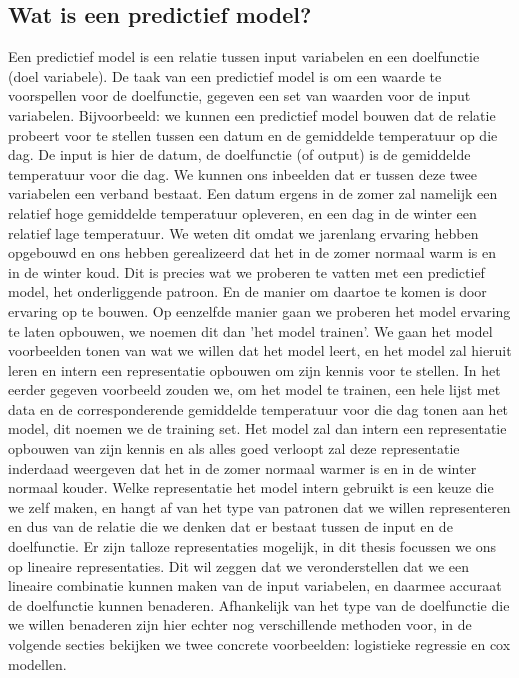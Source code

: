 \begin{abstract*}
\subsection{Wat is een predictief model?}
\label{sec:D:pm}
Een predictief model is een relatie tussen input variabelen en een doelfunctie (doel variabele). De taak van een predictief model is om een waarde te voorspellen voor de doelfunctie, gegeven een set van waarden voor de input variabelen. Bijvoorbeeld: we kunnen een predictief model bouwen dat de relatie probeert voor te stellen tussen een datum en de gemiddelde temperatuur op die dag. De input is hier de datum, de doelfunctie (of output) is de gemiddelde temperatuur voor die dag. We kunnen ons inbeelden dat er tussen deze twee variabelen een verband bestaat. Een datum ergens in de zomer zal namelijk een relatief hoge gemiddelde temperatuur opleveren, en een dag in de winter een relatief lage temperatuur. We weten dit omdat we jarenlang ervaring hebben opgebouwd en ons hebben gerealizeerd dat het in de zomer normaal warm is en in de winter koud. Dit is precies wat we proberen te vatten met een predictief model, het onderliggende patroon. En de manier om daartoe te komen is door ervaring op te bouwen. Op eenzelfde manier gaan we proberen het model ervaring te laten opbouwen, we noemen dit dan 'het model trainen'. We gaan het model voorbeelden tonen van wat we willen dat het model leert, en het model zal hieruit leren en intern een representatie opbouwen om zijn kennis voor te stellen. In het eerder gegeven voorbeeld zouden we, om het model te trainen, een hele lijst met data en de corresponderende gemiddelde temperatuur voor die dag tonen aan het model, dit noemen we de training set. Het model zal dan intern een representatie opbouwen van zijn kennis en als alles goed verloopt zal deze representatie inderdaad weergeven dat het in de zomer normaal warmer is en in de winter normaal kouder. Welke representatie het model intern gebruikt is een keuze die we zelf maken, en hangt af van het type van patronen dat we willen representeren en dus van de relatie die we denken dat er bestaat tussen de input en de doelfunctie. Er zijn talloze representaties mogelijk, in dit thesis focussen we ons op lineaire representaties. Dit wil zeggen dat we veronderstellen dat we een lineaire combinatie kunnen maken van de input variabelen, en daarmee accuraat de doelfunctie kunnen benaderen. Afhankelijk van het type van de doelfunctie die we willen benaderen zijn hier echter nog verschillende methoden voor, in de volgende secties bekijken we twee concrete voorbeelden: logistieke regressie en cox modellen.


\end{abstract*}
